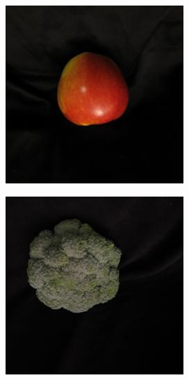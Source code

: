\documentclass{article} %
\begin{document}
\begin{figure}[h]
\begin{subfigure}{.123\textwidth}
\captionsetup{labelformat=empty}
\caption{}
\end{subfigure}%
  \begin{subfigure}{.123\textwidth}
  \centering
\includegraphics[width=\textwidth]{../results/q_samples/mis_rotten/OTHER_0_ROTTEN_2.jpg}
\captionsetup{labelformat=empty}
\caption{}
\end{subfigure}%
  \begin{subfigure}{.123\textwidth}
  \centering
\includegraphics[width=\textwidth]{../results/q_samples/mis_rotten/OTHER_0_ROTTEN_3.jpg}

\end{subfigure}
\end{figure}
\end{document}
